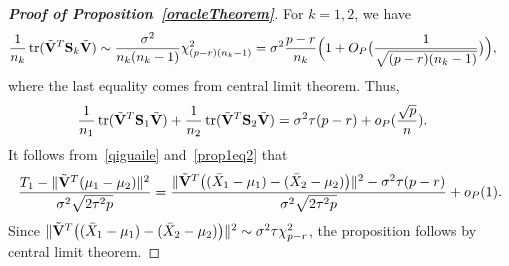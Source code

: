 \documentclass[review]{elsarticle}
\DeclareMathOperator{\mytr}{tr}
\theoremstyle{plain}
\theoremstyle{definition}
\theoremstyle{remark}
\begin{document}
\begin{appendices}
\begin{proof}[\textbf{Proof of Proposition~\ref{oracleTheorem}}]
    For $k=1,2$, we have
    \begin{equation*}
        \begin{aligned}
            &\frac{1}{n_k} \mytr(\tilde{\BV}^T \BS_k \tilde{\BV})\sim \frac{\sigma^2}{n_k(n_k-1)}\chi^2_{(p-r)(n_k-1)}
            =
            \sigma^2\frac{p-r}{n_k}\Big(1+O_P\big(\frac{1}{\sqrt{(p-r)(n_k-1)}}\big)\Big),
        \end{aligned}
    \end{equation*}
    where the last equality comes from central limit theorem. 
    Thus,
    \begin{equation}\label{prop1eq2}
        \begin{aligned}
            &\frac{1}{n_1} \mytr(\tilde{\BV}^T \BS_1 \tilde{\BV})+
            \frac{1}{n_2} \mytr(\tilde{\BV}^T \BS_2 \tilde{\BV})=\sigma^2 \tau (p-r)+o_P(\frac{\sqrt{p}}{n}).
        \end{aligned}
    \end{equation}
It follows from~\eqref{qiguaile} and~\eqref{prop1eq2} that
            $$
            \frac{T_1-\|\tilde{\mathbf{V}}^T(\mu_1-\mu_2)\|^2}{\sigma^2\sqrt{2\tau^2 p}}
            =
            \frac{\|\tilde{\mathbf{V}}^T \big( (\bar{X}_1-\mu_1)-(\bar{X}_2-\mu_2) \big)\|^2-
                \sigma^2 \tau (p-r)}{\sigma^2\sqrt{2\tau^2 p}}
                +o_P(1).
    $$
    Since
$\|\tilde{\mathbf{V}}^T \big( (\bar{X}_1-\mu_1)-(\bar{X}_2-\mu_2) \big)\|^2\sim \sigma^2\tau\chi^2_{p-r}$,
the proposition follows by central limit theorem.
\end{proof}




\end{appendices}
\end{document}
